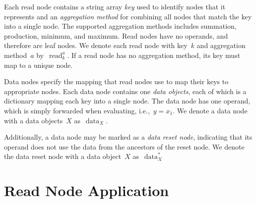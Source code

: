 \documentclass{article}
\DeclareMathOperator{\readNode}{read}
\DeclareMathOperator{\dataNode}{data}
\begin{document}
Each read node contains a string array \emph{key} used to identify nodes that it represents and an \emph{aggregation method} for combining all nodes that match the key into a single node.
The supported aggregation methods includes summation, production, minimum, and maximum.
Read nodes have no operands, and therefore are leaf nodes.
We denote each read node with key~$k$ and aggregation method~$a$ by~$\readNode_k^a$.
If a read node has no aggregation method, its key must map to a unique node.

Data nodes specify the mapping that read nodes use to map their keys to appropriate nodes.
Each data node contains one \emph{data objects}, each of which is a dictionary mapping each key into a single node.
The data node has one operand, which is simply forwarded when evaluating, i.e.,~$y = x_1$.
We denote a data node with a data objects~$X$ as~$\dataNode_X$.

Additionally, a data node may be marked as a \emph{data reset node}, indicating that its operand does not use the data from the ancestors of the reset node.
We denote the data reset node with a data object~$X$ as~$\dataNode^{*}_X$

\section{Read Node Application}
\label{sec:operation:read}
\end{document}
